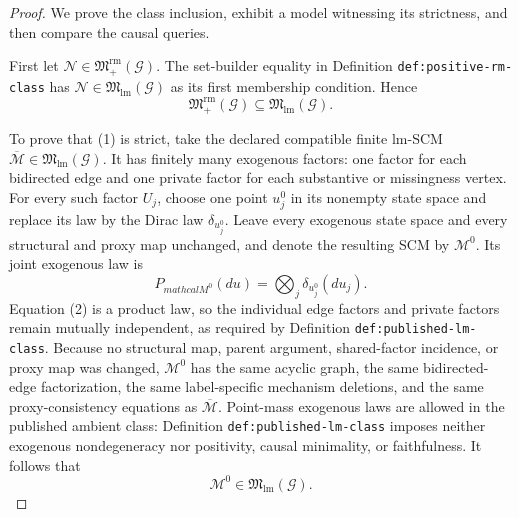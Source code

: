 \documentclass{article}
\begin{document}
\begin{proof}
We prove the class inclusion, exhibit a model witnessing its strictness, and then compare the causal queries.

First let \(\mathcal N\in\mathfrak M_{+}^{\mathrm{rm}}(\mathcal G)\).  The set-builder equality in Definition \texttt{def:positive-rm-class} has \(\mathcal N\in\mathfrak M_{\mathrm{lm}}(\mathcal G)\) as its first membership condition.  Hence
\[
\mathfrak M_{+}^{\mathrm{rm}}(\mathcal G)
\subseteq
\mathfrak M_{\mathrm{lm}}(\mathcal G).
\tag{1}
\]

To prove that (1) is strict, take the declared compatible finite lm-SCM \(\overline{\mathcal M}\in\mathfrak M_{\mathrm{lm}}(\mathcal G)\).  It has finitely many exogenous factors: one factor for each bidirected edge and one private factor for each substantive or missingness vertex.  For every such factor \(U_j\), choose one point \(u_j^0\) in its nonempty state space and replace its law by the Dirac law \(\delta_{u_j^0}\).  Leave every exogenous state space and every structural and proxy map unchanged, and denote the resulting SCM by \(\mathcal M^0\).  Its joint exogenous law is
\[
P_{mathcal M^0}(d u)=\bigotimes_j\delta_{u_j^0}(d u_j).
\tag{2}
\]
Equation (2) is a product law, so the individual edge factors and private factors remain mutually independent, as required by Definition \texttt{def:published-lm-class}.  Because no structural map, parent argument, shared-factor incidence, or proxy map was changed, \(\mathcal M^0\) has the same acyclic graph, the same bidirected-edge factorization, the same label-specific mechanism deletions, and the same proxy-consistency equations as \(\overline{\mathcal M}\).  Point-mass exogenous laws are allowed in the published ambient class: Definition \texttt{def:published-lm-class} imposes neither exogenous nondegeneracy nor positivity, causal minimality, or faithfulness.  It follows that
\[
\mathcal M^0\in\mathfrak M_{\mathrm{lm}}(\mathcal G).
\tag{3}
\]


\end{proof}
\end{document}
